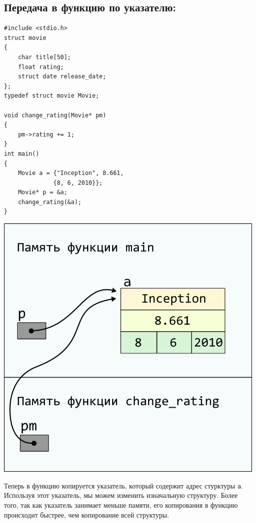 \documentclass{article}
\begin{document}
\subsection*{Передача в функцию по указателю:}
\begin{multicols}{2}
\begin{lstlisting}
#include <stdio.h>
struct movie 
{
    char title[50];
    float rating;
    struct date release_date;
};
typedef struct movie Movie;

void change_rating(Movie* pm) 
{
    pm->rating += 1;
}
int main() 
{
    Movie a = {"Inception", 8.661, 
              {8, 6, 2010}};
    Movie* p = &a;
    change_rating(&a);
}
\end{lstlisting}
\columnbreak
\begin{center}
\includegraphics[scale=0.8]{../images/pointer_schemes/function_by_pointer.png}
\end{center}
\end{multicols}
Теперь в функцию копируется указатель, который содержит
адрес стурктуры \texttt{a}. Используя этот указатель, мы можем изменить изначальную структуру. Более того, так как указатель занимает меньше памяти, его копирования в функцию происходит быстрее, чем копирование всей структуры.
\end{document}
